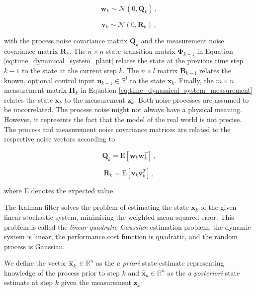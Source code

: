 \begin{equation}\label{eq:process_noise}
  \mathbf{w}_{k} \sim \mathcal{N}(0,\mathbf{Q}_k)\,,
\end{equation}

\begin{equation}\label{eq:measurement_noise}
  \mathbf{v}_{k} \sim \mathcal{N}(0,\mathbf{R}_k)\,,
\end{equation}
 
\noindent
with the process noise covariance matrix $\mathbf{Q}_k$ and the measurement noise covariance matrix $\mathbf{R}_k$. The $n\times n$ state transition matrix $\bm{\Phi}_{k-1}$ in Equation \ref{eq:time_dynamical_system_plant} relates the state at the previous time step $k-1$ to the state at the current step $k$. The $n\times l$ matrix $\mathbf{B}_{k-1}$ relates the known, optional control input $\mathbf{u}_{k-1} \in \mathbb{R}^l$ to the state $\mathbf{x}_k$. Finally, the $m\times n$ measurement matrix $\mathbf{H}_{k}$ in Equation \ref{eq:time_dynamical_system_measurement} relates the state $\mathbf{x}_k$ to the measurement $\mathbf{z}_k$. Both noise processes are assumed to be uncorrelated. The process noise might not always have a physical meaning. However, it represents the fact that the model of the real world is not precise. The process and measurement noise covariance matrices are related to the respective noise vectors according to

\begin{equation}
  \mathbf{Q}_k = \mbox{E}[\mathbf{w}_{k} \mathbf{w}^T_{k}]\,,
\end{equation}

\begin{equation}
  \mathbf{R}_k = \mbox{E}[\mathbf{v}_{k} \mathbf{v}^T_{k}]\,,
\end{equation}

\noindent
where E denotes the expected value.

The Kalman filter solves the problem of estimating the state $\mathbf{x}_k$ of the given linear stochastic system, minimising the weighted mean-squared error. This problem is called the \emph{linear quadratic Gaussian} estimation problem; the dynamic system is linear, the performance cost function is quadratic, and the random process is Gaussian.

We define the vector $\hat{\mathbf{x}}^-_k \in \mathbb{R}^n$ as the \emph{a priori} state estimate representing knowledge of the process prior to step $k$ and $\hat{\mathbf{x}}_k \in \mathbb{R}^n$ as the \emph{a posteriori} state estimate at step $k$ given the measurement $\mathbf{z}_k$:

